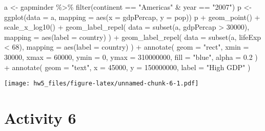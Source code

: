 \documentclass[
]{article}
\newenvironment{Shaded}{\begin{snugshade}}{\end{snugshade}}
\newcommand{\AttributeTok}[1]{\textcolor[rgb]{0.77,0.63,0.00}{#1}}
\newcommand{\DecValTok}[1]{\textcolor[rgb]{0.00,0.00,0.81}{#1}}
\newcommand{\FloatTok}[1]{\textcolor[rgb]{0.00,0.00,0.81}{#1}}
\newcommand{\FunctionTok}[1]{\textcolor[rgb]{0.00,0.00,0.00}{#1}}
\newcommand{\NormalTok}[1]{#1}
\newcommand{\OtherTok}[1]{\textcolor[rgb]{0.56,0.35,0.01}{#1}}
\newcommand{\SpecialCharTok}[1]{\textcolor[rgb]{0.00,0.00,0.00}{#1}}
\newcommand{\StringTok}[1]{\textcolor[rgb]{0.31,0.60,0.02}{#1}}
\begin{document}
\begin{Shaded}
\begin{Highlighting}[]
\NormalTok{a }\OtherTok{\textless{}{-}}\NormalTok{ gapminder }\SpecialCharTok{\%\textgreater{}\%} \FunctionTok{filter}\NormalTok{(continent }\SpecialCharTok{==} \StringTok{"Americas"} \SpecialCharTok{\&}\NormalTok{ year }\SpecialCharTok{==} \StringTok{"2007"}\NormalTok{)}
\NormalTok{p }\OtherTok{\textless{}{-}} \FunctionTok{ggplot}\NormalTok{(}\AttributeTok{data =}\NormalTok{ a, }\AttributeTok{mapping =} \FunctionTok{aes}\NormalTok{(}\AttributeTok{x =}\NormalTok{ gdpPercap, }\AttributeTok{y =}\NormalTok{ pop))}
\NormalTok{p }\SpecialCharTok{+} \FunctionTok{geom\_point}\NormalTok{() }\SpecialCharTok{+} \FunctionTok{scale\_x\_log10}\NormalTok{() }\SpecialCharTok{+} \FunctionTok{geom\_label\_repel}\NormalTok{(}
      \AttributeTok{data =} \FunctionTok{subset}\NormalTok{(a, gdpPercap }\SpecialCharTok{\textgreater{}} \DecValTok{30000}\NormalTok{),}
      \AttributeTok{mapping =} \FunctionTok{aes}\NormalTok{(}\AttributeTok{label =}\NormalTok{ country)}
\NormalTok{    ) }\SpecialCharTok{+} \FunctionTok{geom\_label\_repel}\NormalTok{(}
      \AttributeTok{data =} \FunctionTok{subset}\NormalTok{(a, lifeExp }\SpecialCharTok{\textless{}} \DecValTok{68}\NormalTok{),}
      \AttributeTok{mapping =} \FunctionTok{aes}\NormalTok{(}\AttributeTok{label =}\NormalTok{ country)}
\NormalTok{    ) }\SpecialCharTok{+} \FunctionTok{annotate}\NormalTok{(}
      \AttributeTok{geom =} \StringTok{"rect"}\NormalTok{, }\AttributeTok{xmin =} \DecValTok{30000}\NormalTok{, }\AttributeTok{xmax =} \DecValTok{60000}\NormalTok{,}
      \AttributeTok{ymin =} \DecValTok{0}\NormalTok{, }\AttributeTok{ymax =} \DecValTok{310000000}\NormalTok{, }\AttributeTok{fill =} \StringTok{"blue"}\NormalTok{, }\AttributeTok{alpha =} \FloatTok{0.2}
\NormalTok{    ) }\SpecialCharTok{+} \FunctionTok{annotate}\NormalTok{(}
      \AttributeTok{geom =} \StringTok{"text"}\NormalTok{, }\AttributeTok{x =} \DecValTok{45000}\NormalTok{, }\AttributeTok{y =} \DecValTok{150000000}\NormalTok{,}
      \AttributeTok{label =} \StringTok{"High GDP"}
\NormalTok{    )}
\end{Highlighting}
\end{Shaded}

\texttt{[image: hw5\_files/figure-latex/unnamed-chunk-6-1.pdf]}

\hypertarget{activity-6}{%
\section{Activity 6}\label{activity-6}}
\end{document}
